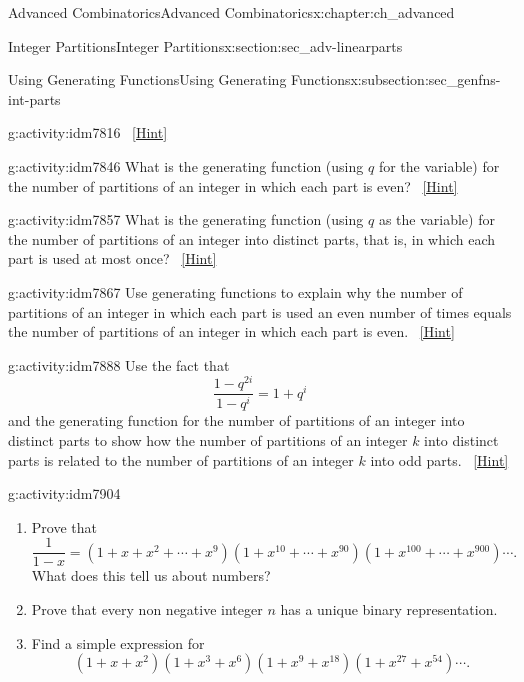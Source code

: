 \documentclass[oneside,10pt,]{book}
\numberwithin{equation}{chapter}
\begin{document}
\begin{chapterptx}{Advanced Combinatorics}{}{Advanced Combinatorics}{}{}{x:chapter:ch_advanced}
\begin{sectionptx}{Integer Partitions}{}{Integer Partitions}{}{}{x:section:sec_adv-linearparts}
\begin{subsectionptx}{Using Generating Functions}{}{Using Generating Functions}{}{}{x:subsection:sec_genfns-int-parts}
\begin{activity}{}{g:activity:idm7816}
\qquad~\hfill{\tiny\hyperlink{g:hint:idm7827-back}{[Hint]}}\end{activity}
\begin{activity}{}{g:activity:idm7846}%
What is the generating function (using \(q\) for the variable) for the number of partitions of an integer in which each part is even?%
\qquad~\hfill{\tiny\hyperlink{g:hint:idm7850-back}{[Hint]}}\end{activity}
\begin{activity}{}{g:activity:idm7857}%
What is the generating function (using \(q\) as the variable) for the number of partitions of an integer into distinct parts, that is, in which each part is used at most once?%
\qquad~\hfill{\tiny\hyperlink{g:hint:idm7861-back}{[Hint]}}\end{activity}
\begin{activity}{}{g:activity:idm7867}%
Use generating functions to explain why the number of partitions of an integer in which each part is used an even number of times equals the number of partitions of an integer in which each part is even.%
\qquad~\hfill{\tiny\hyperlink{g:hint:idm7870-back}{[Hint]}}\end{activity}
\begin{activity}{}{g:activity:idm7888}%
Use the fact that%
\begin{equation*}
\frac{1-q^{2i}}{1-q^i}= 1+q^i
\end{equation*}
and the generating function for the number of partitions of an integer into distinct parts to show how the number of partitions of an integer \(k\) into distinct parts is related to the number of partitions of an integer \(k\) into odd parts.%
\qquad~\hfill{\tiny\hyperlink{g:hint:idm7894-back}{[Hint]}}\end{activity}
\begin{activity}{}{g:activity:idm7904}%
\begin{enumerate}[font=\bfseries,label=(\alph*),ref=\alph*]
\item{}Prove that%
\begin{equation*}
\frac{1}{1-x} = (1 + x + x^2 +\cdots + x^9)(1 + x^{10} + \cdots + x^{90})(1 + x^{100} + \cdots + x^{900})\cdots.
\end{equation*}
What does this tell us about numbers?%
\item{}Prove that every non negative integer \(n\) has a unique binary representation.%
\item{}Find a simple expression for%
\begin{equation*}
(1+x+x^2)(1+x^3+x^6)(1+x^9+x^{18})(1+x^{27}+x^{54})\cdots.

\end{equation*}
\end{enumerate}
\end{activity}
\end{subsectionptx}
\end{sectionptx}
\end{chapterptx}
\end{document}
